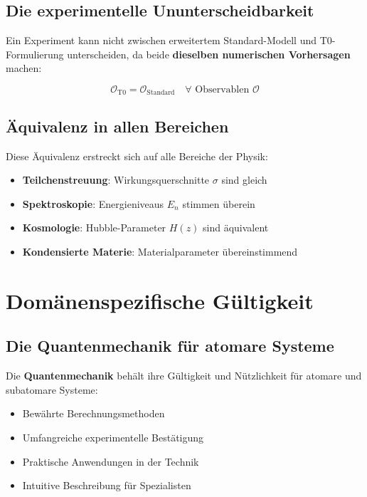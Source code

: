 \documentclass[12pt,a4paper]{report}
\begin{document}
	\subsection{Die experimentelle Ununterscheidbarkeit}
	
	Ein Experiment kann nicht zwischen erweitertem Standard-Modell und T0-Formulierung unterscheiden, da beide \textbf{dieselben numerischen Vorhersagen} machen:
	
	\begin{equation}
		\mathcal{O}_{\text{T0}} = \mathcal{O}_{\text{Standard}} \quad \forall \text{ Observablen } \mathcal{O}
	\end{equation}
	
	\subsection{Äquivalenz in allen Bereichen}
	
	Diese Äquivalenz erstreckt sich auf alle Bereiche der Physik:
	
	\begin{itemize}
		\item \textbf{Teilchenstreuung}: Wirkungsquerschnitte $\sigma$ sind gleich
		\item \textbf{Spektroskopie}: Energieniveaus $E_n$ stimmen überein
		\item \textbf{Kosmologie}: Hubble-Parameter $H(z)$ sind äquivalent
		\item \textbf{Kondensierte Materie}: Materialparameter übereinstimmend
	\end{itemize}
	
	\section{Domänenspezifische Gültigkeit}
	
	\subsection{Die Quantenmechanik für atomare Systeme}
	
	Die \textbf{Quantenmechanik} behält ihre Gültigkeit und Nützlichkeit für atomare und subatomare Systeme:
	
	\begin{itemize}
		\item Bewährte Berechnungsmethoden
		\item Umfangreiche experimentelle Bestätigung
		\item Praktische Anwendungen in der Technik
		\item Intuitive Beschreibung für Spezialisten
	\end{itemize}
	
\end{document}
